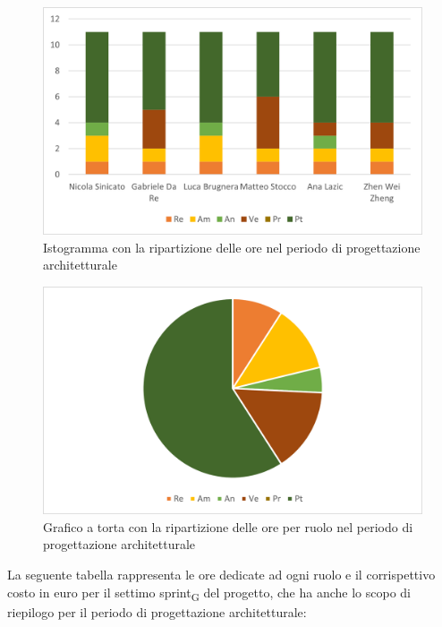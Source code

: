 	\begin{figure}[H]
		\centering
		\includegraphics[scale=0.6]{img/grafi preventivo/istogrammi/architetturale/complessivo.png}
		\caption{Istogramma con la ripartizione delle ore nel periodo di progettazione architetturale}
	\end{figure}
	\begin{figure}[H]
		\centering
		\includegraphics[scale=0.6]{img/grafi preventivo/torta/architetturale/complessivo.png}
		\caption{Grafico a torta con la ripartizione delle ore per ruolo nel periodo di progettazione architetturale}
	\end{figure}
	La seguente tabella rappresenta le ore dedicate ad ogni ruolo e il corrispettivo costo in euro per il settimo sprint\textsubscript{G} del progetto, che ha anche lo scopo di riepilogo per il periodo di progettazione architetturale:
	

